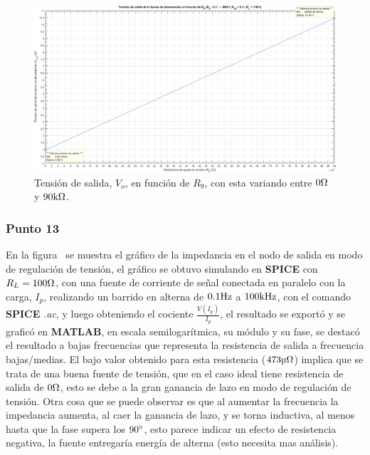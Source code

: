 \vfill

\clearpage

\begin{figure}[H] %
\begin{center}
\includegraphics[width=1.2 \textwidth, angle=90]{./img/preguntas/p21_6.png}
\caption{\label{fig:fig_p21_p6_output_voltage}\footnotesize{Tensión de salida, $V_{o}$, en función de $R_{9}$, con esta variando entre $0 \si[per-mode=symbol]{\ohm}$ y $90 \si[per-mode=symbol]{\kilo\ohm}$.}}
\end{center}
\end{figure}



\clearpage


\subsubsection{Punto 13}


En la figura~ se muestra el gráfico de la impedancia en el nodo de salida en modo de regulación de tensión, el gráfico se obtuvo simulando en \textbf{SPICE} con $R_{L} = 100 \si[per-mode=symbol]{\ohm}$, con una fuente de corriente de señal conectada en paralelo con la carga, $I_{p}$, realizando un barrido en alterna de $0.1 \si[per-mode=symbol]{\hertz}$ a $100 \si[per-mode=symbol]{\kilo\hertz}$, con el comando \textbf{SPICE} \textit{.ac}, y luego obteniendo el cociente $\frac{V\left(I_{p}\right)}{I_{p}}$, el resultado se exportó y se graficó en \textbf{MATLAB}, en escala semilogarítmica, su módulo y su fase, se destacó el resultado a bajas frecuencias que representa la resistencia de salida a frecuencia bajas/medias. El bajo valor obtenido para esta resistencia ($473 \si[per-mode=symbol]{\micro\ohm}$) implica que se trata de una buena fuente de tensión, que en el caso ideal tiene resistencia de salida de $0 \si[per-mode=symbol]{\ohm}$, esto se debe a la gran ganancia de lazo en modo de regulación de tensión. Otra cosa que se puede observar es que al aumentar la frecuencia la impedancia aumenta, al caer la ganancia de lazo, y se torna inductiva, al menos hasta que la fase supera los $90 \si[per-mode=symbol]{\degree}$, esto parece indicar un efecto de resistencia negativa, la fuente entregaría energía de alterna (esto necesita mas análisis).



